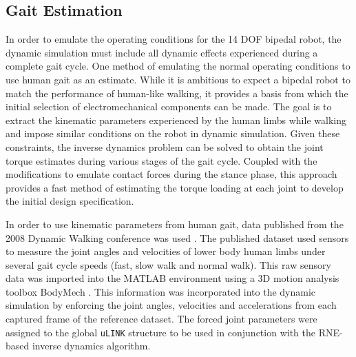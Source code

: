 \subsection{Gait Estimation} %
\label{sec:gait_estimation}
	
In order to emulate the operating conditions for the 14 DOF bipedal robot, the dynamic simulation must include all dynamic effects experienced during a complete gait cycle. One method of emulating the normal operating conditions to use human gait as an estimate. While it is ambitious to expect a bipedal robot to match the performance of human-like walking, it provides a basis from which the initial selection of electromechanical components can be made. The goal is to extract the kinematic parameters experienced by the human limbs while walking and impose similar conditions on the robot in dynamic simulation. Given these constraints, the inverse dynamics problem can be solved to obtain the joint torque estimates during various stages of the gait cycle. Coupled with the modifications to emulate contact forces during the stance phase, this approach provides a fast method of estimating the torque loading at each joint to develop the initial design specification. 
	
In order to use kinematic parameters from human gait, data published from the 2008 Dynamic Walking conference was used \cite{dw2008}. The published dataset used sensors to measure the joint angles and velocities of lower body human limbs under several gait cycle speeds (fast, slow walk and normal walk). This raw sensory data was imported into the MATLAB environment using a 3D motion analysis toolbox BodyMech \cite{bodymech}. This information was incorporated into the dynamic simulation by enforcing the joint angles, velocities and accelerations from each captured frame of the reference dataset. The forced joint parameters were assigned to the global \texttt{uLINK} structure to be used in conjunction with the RNE-based inverse dynamics algorithm. 

